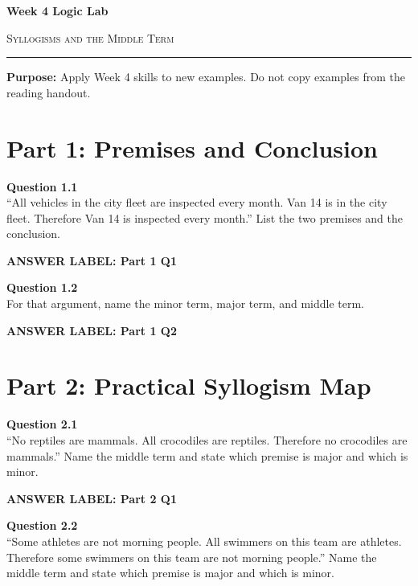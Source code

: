 \documentclass[12pt]{article}
\newcommand{\answerbox}[2]{%
\vspace{0.15em}
\noindent\textbf{#1}\par
\vspace{0.05em}
\noindent\fbox{%
\begin{minipage}[t][#2]{\dimexpr\textwidth-2\fboxsep-2\fboxrule}
\rule{\textwidth}{0pt}
\vspace{#2}
\end{minipage}
}\par
\vspace{0.25em}
}
\begin{document}
\begin{center}
{\LARGE\bfseries Week 4 Logic Lab}\par\vspace{0.05em}
{\large\scshape Syllogisms and the Middle Term}\par\vspace{0.1em}
\rule{0.78\textwidth}{0.5pt}\par\vspace{0.15em}
\end{center}

\noindent\textbf{Purpose:} Apply Week 4 skills to new examples. Do not copy examples from the reading handout.

\vspace{0.3em}

\section*{Part 1: Premises and Conclusion}

\textbf{Question 1.1}\\[-0.15em]
``All vehicles in the city fleet are inspected every month. Van 14 is in the city fleet. Therefore Van 14 is inspected every month.'' List the two premises and the conclusion.

\answerbox{ANSWER LABEL: Part 1 Q1}{2.15in}

\textbf{Question 1.2}\\[-0.15em]
For that argument, name the minor term, major term, and middle term.

\answerbox{ANSWER LABEL: Part 1 Q2}{1.85in}

\newpage

\section*{Part 2: Practical Syllogism Map}

\textbf{Question 2.1}\\[-0.15em]
``No reptiles are mammals. All crocodiles are reptiles. Therefore no crocodiles are mammals.'' Name the middle term and state which premise is major and which is minor.

\answerbox{ANSWER LABEL: Part 2 Q1}{2.15in}

\textbf{Question 2.2}\\[-0.15em]
``Some athletes are not morning people. All swimmers on this team are athletes. Therefore some swimmers on this team are not morning people.'' Name the middle term and state which premise is major and which is minor.
\end{document}
